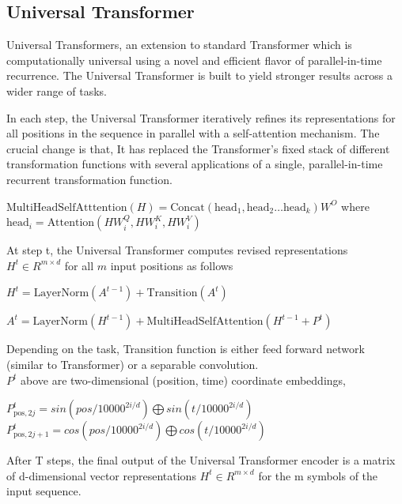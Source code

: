 \documentclass{article}
\begin{document}
\begin{multicols}{2}
    \section{Universal Transformer}
     Universal Transformers, an extension to standard Transformer which is computationally universal using a novel and efficient flavor of parallel-in-time recurrence. The Universal Transformer is built to yield stronger results across a wider range of tasks.
     
     In each step, the Universal Transformer iteratively refines its representations for all positions in the
sequence in parallel with a self-attention mechanism. The crucial change is that, It has replaced the Transformer’s fixed stack of different transformation functions with several applications of a single, parallel-in-time recurrent transformation function.


\begin{center}
$\text{MultiHeadSelfAtttention}(H) = \text{Concat} (\text{head}_1, \text{head}_2 \dots \text{head}_k)W^O$
where $\text{head}_i = \text{Attention} (HW^Q_i,HW^K_i, HW^V_i)$
\end{center}

At step t, the Universal Transformer computes revised representations $H^t \in  R^{m\times d}$ for all $m$ input positions as follows

\begin{center}
$H^t  = \text{LayerNorm}(A^{t-1})+\text{Transition}(A^t)$
\end{center}
\begin{center}
 \noindent $ A^t  = \text{LayerNorm}(H^{t-1})+\text{MultiHeadSelfAttention}(H^{t-1}+P^t)$
\end{center}

\noindent Depending on the task, Transition function is either feed forward network (similar to Transformer) or a separable
convolution. \\
$P^t$ above are two-dimensional (position, time) coordinate embeddings,

\begin{center}
$P^t_{\text{pos},2j} = sin(pos/10000^{2i/d})\bigoplus sin(t/10000^{2i/d})$
$P^t_{\text{pos},2j+1} = cos(pos/10000^{2i/d})\bigoplus cos(t/10000^{2i/d})$
\end{center}

After T steps, the final output of the Universal Transformer encoder is a matrix of d-dimensional vector representations $H^t \in  R^{m\times d}$ for the m symbols of the input sequence.



\end{multicols}
\end{document}
